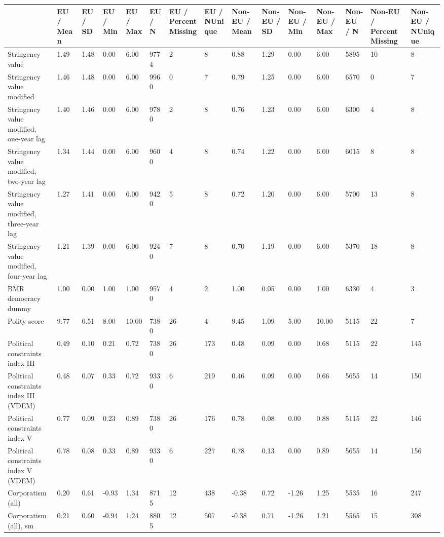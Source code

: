 
\begin{longtable}{lllllllllllllll}
\toprule
  & EU / Mean & EU / SD & EU / Min & EU / Max & EU / N & EU / PercentMissing & EU / NUnique & Non-EU / Mean & Non-EU / SD & Non-EU / Min & Non-EU / Max & Non-EU / N & Non-EU / PercentMissing & Non-EU / NUnique\\
\midrule
Stringency value & 1.49 & 1.48 & 0.00 & 6.00 & 9774 & 2 & 8 & 0.88 & 1.29 & 0.00 & 6.00 & 5895 & 10 & 8\\
Stringency value modified & 1.46 & 1.48 & 0.00 & 6.00 & 9960 & 0 & 7 & 0.79 & 1.25 & 0.00 & 6.00 & 6570 & 0 & 7\\
Stringency value modified, one-year lag & 1.40 & 1.46 & 0.00 & 6.00 & 9780 & 2 & 8 & 0.76 & 1.23 & 0.00 & 6.00 & 6300 & 4 & 8\\
Stringency value modified, two-year lag & 1.34 & 1.44 & 0.00 & 6.00 & 9600 & 4 & 8 & 0.74 & 1.22 & 0.00 & 6.00 & 6015 & 8 & 8\\
Stringency value modified, three-year lag & 1.27 & 1.41 & 0.00 & 6.00 & 9420 & 5 & 8 & 0.72 & 1.20 & 0.00 & 6.00 & 5700 & 13 & 8\\
\addlinespace
Stringency value modified, four-year lag & 1.21 & 1.39 & 0.00 & 6.00 & 9240 & 7 & 8 & 0.70 & 1.19 & 0.00 & 6.00 & 5370 & 18 & 8\\
BMR democracy dummy & 1.00 & 0.00 & 1.00 & 1.00 & 9570 & 4 & 2 & 1.00 & 0.05 & 0.00 & 1.00 & 6330 & 4 & 3\\
Polity score & 9.77 & 0.51 & 8.00 & 10.00 & 7380 & 26 & 4 & 9.45 & 1.09 & 5.00 & 10.00 & 5115 & 22 & 7\\
Political constraints index III & 0.49 & 0.10 & 0.21 & 0.72 & 7380 & 26 & 173 & 0.48 & 0.09 & 0.00 & 0.68 & 5115 & 22 & 145\\
Political constraints index III (VDEM) & 0.48 & 0.07 & 0.33 & 0.72 & 9330 & 6 & 219 & 0.46 & 0.09 & 0.00 & 0.66 & 5655 & 14 & 150\\
\addlinespace
Political constraints index V & 0.77 & 0.09 & 0.23 & 0.89 & 7380 & 26 & 176 & 0.78 & 0.08 & 0.00 & 0.88 & 5115 & 22 & 146\\
Political constraints index V (VDEM) & 0.78 & 0.08 & 0.33 & 0.89 & 9330 & 6 & 227 & 0.78 & 0.13 & 0.00 & 0.89 & 5655 & 14 & 156\\
Corporatism (all) & 0.20 & 0.61 & -0.93 & 1.34 & 8715 & 12 & 438 & -0.38 & 0.72 & -1.26 & 1.25 & 5535 & 16 & 247\\
Corporatism (all), sm & 0.21 & 0.60 & -0.94 & 1.24 & 8805 & 12 & 507 & -0.38 & 0.71 & -1.26 & 1.21 & 5565 & 15 & 308\\

\end{longtable}
